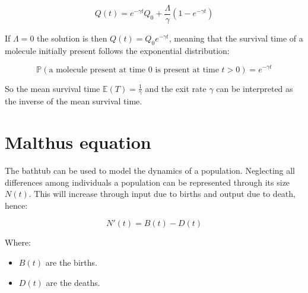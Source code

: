 	$$Q(t) = e^{-\gamma t}Q_0+\frac{\Lambda}{\gamma}(1-e^{-\gamma t})$$

	If $\Lambda = 0$ the solution is then $Q(t) = Q_0e^{-\gamma t}$, meaning that the survival time of a molecule initially present follows the exponential distribution:

	$$\mathbb{P}(\text{a molecule present at time }0\text{ is present at time }t>0) = e^{-\gamma t}$$

	So the mean survival time $\mathbb{E}(T) = \frac{1}{\gamma}$ and the exit rate $\gamma$ can be interpreted as the inverse of the mean survival time.

\section{Malthus equation}
The bathtub can be used to model the dynamics of a population.
Neglecting all differences among individuals a population can be represented through its size $N(t)$.
This will increase through input due to births and output due to death, hence:

$$N'(t) = B(t)-D(t)$$

Where:

\begin{multicols}{2}
	\begin{itemize}
		\item $B(t)$ are the births.
		\item $D(t)$ are the deaths.
	\end{itemize}
\end{multicols}
